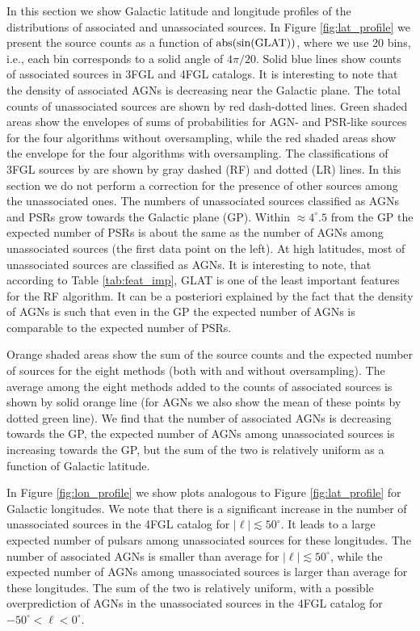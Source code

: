 In this section we show Galactic latitude and longitude profiles of the distributions of associated and unassociated sources.
In Figure \ref{fig:lat_profile} we present the source counts as a function of ${\rm abs(sin(GLAT))}$,
where we use 20 bins, i.e., each bin corresponds to a solid angle of $4 \pi / 20$. 
Solid blue lines show counts of associated sources in 3FGL and 4FGL catalogs.
It is interesting to note that the density of associated AGNs is decreasing near the Galactic plane.
The total counts of unassociated sources are shown by red dash-dotted lines.
Green shaded areas show the envelopes of sums of probabilities for AGN- and PSR-like sources for the four 
algorithms without oversampling, while the red shaded areas show the envelope for the four algorithms 
with oversampling.
The classifications of 3FGL sources by \cite{2016ApJ...820....8S} are shown by gray dashed (RF) and dotted (LR) lines.
In this section we do not perform a correction for the presence of other sources among the unassociated ones.
The numbers of unassociated sources classified as AGNs and PSRs grow towards the Galactic plane (GP).
Within $\approx 4^\circ\!\!.5$ from the GP the expected number of PSRs is about the same as the number of AGNs among unassociated sources (the first data point on the left).
At high latitudes, most of unassociated sources are classified as AGNs.
It is interesting to note, that according to Table \ref{tab:feat_imp}, GLAT is one of the least important features for the RF algorithm.
It can be a posteriori explained by the fact that
 the density of AGNs is such that even in the GP the expected number of AGNs is comparable to the expected number of PSRs.

Orange shaded areas show the sum of the source counts and the expected number of sources for the eight methods (both with and without oversampling).
The average among the eight methods added to the counts of associated sources is shown by solid orange line 
(for AGNs we also show the mean of these points by dotted green line).
We find that the number of associated AGNs is decreasing towards the GP, the expected number of AGNs among unassociated sources is increasing towards the GP, but the sum of the two is relatively uniform as a function of Galactic latitude.


In Figure \ref{fig:lon_profile} we show plots analogous to Figure \ref{fig:lat_profile} for Galactic longitudes.
We note that there is a significant increase in the number of unassociated sources in the 4FGL catalog for $|\ell | \lesssim 50^\circ$.
It leads to a large expected number of pulsars among unassociated sources for these longitudes.
The number of associated AGNs is smaller than average for $|\ell | \lesssim 50^\circ$, while the expected number of AGNs among unassociated sources is larger than average for these longitudes.
The sum of the two is relatively uniform, with a possible overprediction of AGNs in the unassociated sources in the 4FGL catalog for \mbox{$-50^\circ < \ell < 0^\circ$}.










